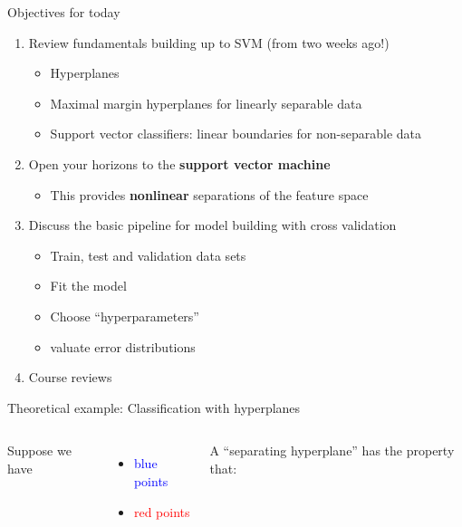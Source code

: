 \documentclass[mathserif, aspectratio=169]{beamer}
\begin{document}
\begin{frame}{Objectives for today}
	\begin{enumerate}
		\item Review fundamentals building up to SVM (from two weeks ago!)
		      \begin{itemize}
			      \item Hyperplanes
			      \item Maximal margin hyperplanes for linearly separable data
			      \item Support vector classifiers: linear boundaries for non-separable data
		      \end{itemize}
		\item Open your horizons to the \textbf{support vector machine}
		      \begin{itemize}
			      \item This provides \textbf{nonlinear} separations of the feature space
		      \end{itemize}
	    \item Discuss the basic pipeline for model building with cross validation
	    \begin{itemize}
	    	\item Train, test and validation data sets
	    	\item Fit the model
	    	\item Choose ``hyperparameters''
	    	\item valuate error distributions
    	\end{itemize}
    	\item Course reviews
	\end{enumerate}

\end{frame}


\begin{frame}{Theoretical example: Classification with hyperplanes}
	\begin{columns}
		Suppose we have
		\begin{itemize}
			\item \textcolor{blue}{blue points}
			\item \textcolor{red}{red points}
		\end{itemize}
		\vspace{10mm}
		A ``separating hyperplane'' has the property that:


	\end{columns}

\end{frame}
\end{document}
